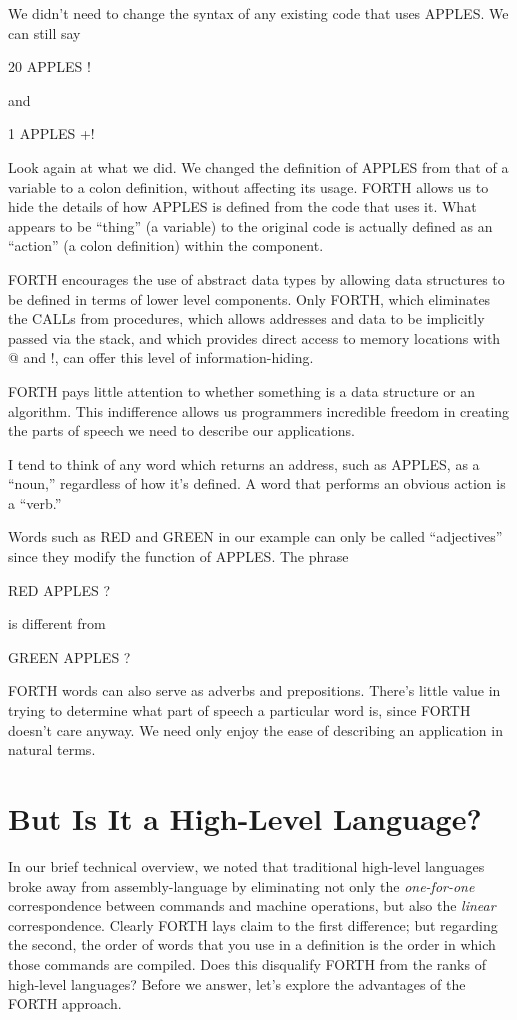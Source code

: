 We didn't need to change the syntax of any existing code that uses
APPLES. We can still say

\begin{Code}
20 APPLES !
\end{Code}
and

\begin{Code}
1 APPLES +!
\end{Code}
Look again at what we did. We changed the definition of APPLES from
that of a variable to a colon definition, without affecting its usage.
FORTH allows us to hide the details of how APPLES is defined from
the code that uses it. What appears to be {}``thing'' (a variable)
to the original code is actually defined as an {}``action'' (a colon
definition) within the component.

FORTH encourages the use of abstract data types by allowing data structures
to be defined in terms of lower level components. Only FORTH, which
eliminates the CALLs from procedures, which allows addresses and data
to be implicitly passed via the stack, and which provides direct access
to memory locations with @ and !, can offer this level of information-hiding.

FORTH pays little attention to whether something is a data structure
or an algorithm. This indifference allows us programmers incredible
freedom in creating the parts of speech we need to describe our applications.

I tend to think of any word which returns an address, such as APPLES,
as a {}``noun,'' regardless of how it's defined. A word that performs
an obvious action is a {}``verb.''

Words such as RED and GREEN in our example can only be called {}``adjectives''
since they modify the function of APPLES. The phrase

\begin{Code}
RED APPLES ?
\end{Code}
is different from

\begin{Code}
GREEN APPLES ?
\end{Code}
FORTH words can also serve as adverbs and prepositions. There's little
value in trying to determine what part of speech a particular word
is, since FORTH doesn't care anyway. We need only enjoy the ease of
describing an application in natural terms.


\section{But Is It a High-Level Language?}
In our brief technical overview, we noted that traditional high-level
languages broke away from assembly-language by eliminating not only
the \emph{one-for-one} correspondence between commands and machine
operations, but also the \emph{linear} correspondence. Clearly FORTH
lays claim to the first difference; but regarding the second, the
order of words that you use in a definition is the order in which
those commands are compiled. Does this disqualify FORTH from the ranks
of high-level languages? Before we answer, let's explore the advantages
of the FORTH approach.

